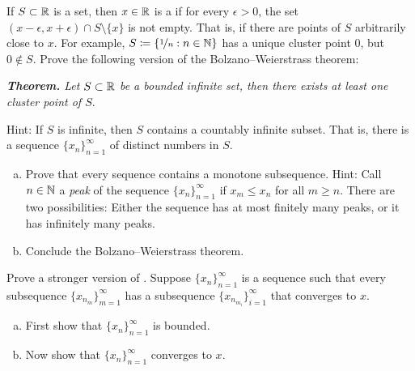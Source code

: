 \begin{exercise}
If $S \subset {\mathbb{R}}$ is a set, then $x \in {\mathbb{R}}$ is a \emph{}
if for every $\epsilon > 0$, the set $(x-\epsilon,x+\epsilon) \cap S
\setminus \{ x \}$ is not empty.  That is, if there are points of $S$
arbitrarily close to $x$.
For example, $S \coloneqq \{ \nicefrac{1}{n} : n \in {\mathbb{N}} \}$ has a unique cluster point $0$, but $0 \notin S$.
Prove the following version of the Bolzano--Weierstrass theorem:

\medskip

\noindent
\emph{\textbf{Theorem.} Let $S \subset {\mathbb{R}}$ be a bounded infinite set,
then there exists at least one cluster point of $S$}.

\medskip

Hint: If $S$ is infinite, then $S$ contains a countably infinite subset.
That is, there is a sequence $\{ x_n \}_{n=1}^\infty$ of distinct numbers in $S$.
\end{exercise}

\begin{samepage}
\begin{exercise}[Challenging]
\leavevmode
\begin{enumerate}[a)]
\item
Prove that every sequence contains a monotone subsequence.
Hint: Call $n \in {\mathbb{N}}$ a \emph{peak}
of the sequence
$\{ x_n \}_{n=1}^\infty$
if $x_m \leq x_n$ for all $m \geq n$.
There are two possibilities: Either the sequence has at most finitely many
peaks,
or it has infinitely many peaks.
\item
Conclude the Bolzano--Weierstrass theorem.
\end{enumerate}
\end{exercise}
\end{samepage}

\begin{exercise}
\pagebreak[2]
Prove a stronger version of .
Suppose $\{ x_n \}_{n=1}^\infty$ is a sequence such that every subsequence
$\{ x_{n_m} \}_{m=1}^\infty$ has a subsequence
$\{ x_{n_{m_i}} \}_{i=1}^\infty$ that converges to $x$.
\begin{enumerate}[a)]
\item
First show that $\{ x_n \}_{n=1}^\infty$ is
bounded.
\item
Now show that $\{ x_n \}_{n=1}^\infty$ converges to $x$.
\end{enumerate}
\end{exercise}

